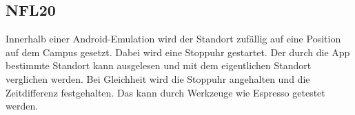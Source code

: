 \subsection*{NFL20}
Innerhalb einer \Gls{Android}-\Gls{Emulation} wird der Standort zufällig auf eine Position auf dem \Gls{Campus} gesetzt.
Dabei wird eine Stoppuhr gestartet.
Der durch die App bestimmte Standort kann ausgelesen und mit dem eigentlichen Standort verglichen werden.
Bei Gleichheit wird die Stoppuhr angehalten und die Zeitdifferenz festgehalten.
Das kann durch Werkzeuge wie \Gls{Espresso} getestet werden.